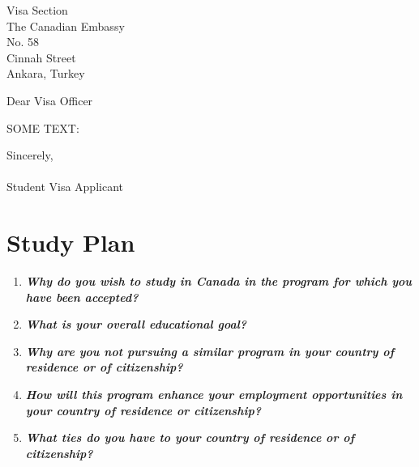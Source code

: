 \documentclass[
fontsize=11pt,
paper=a4,
parskip=half,
enlargefirstpage=on,    %
fromalign=right,        %
fromphone=on,           %
fromemail=on,
fromrule=aftername,     %
addrfield=on,           %
backaddress=on,         %
subject=beforeopening,  %
locfield=narrow,        %
foldmarks=off,           %
open=any
]{scrartcl}
\begin{document}
	\begin{letter}{Visa Section \\ The Canadian Embassy \\ No. 58 \\ Cinnah Street \\ Ankara, Turkey}
		\opening{Dear Visa Officer}
		

SOME TEXT: \lipsum[2-3]
\closing{Sincerely,\\
\textbf{\textit{{\large {}}}} \\ Student Visa Applicant}
\end{letter}

\newpage
\tableofcontents
\newpage
\section{Study Plan}
\begin{enumerate}

\item \textbf{\textit{Why do you wish to study in Canada in the program for which you have been accepted?}}

\lipsum[1-3]

\item \textbf{\textit{What is your overall educational goal? }}

\lipsum[1-3]

\item \textbf{\textit{Why are you not pursuing a similar program in your country of residence or of citizenship?}}

\lipsum[1-3]

\item \textbf{\textit{How will this program enhance your employment opportunities in your country of residence or citizenship?}}

\lipsum[1-3]

\item \textbf{\textit{What ties do you have to your country of residence or of citizenship?}}

\lipsum[1-3]

\end{enumerate}
\newpage


\end{document}

